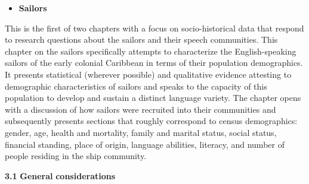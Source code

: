 \setcounter{itemize}{2}
\begin{itemize}
\item \begin{styleListParagraph}
\textbf{Sailors}
\end{styleListParagraph}
\end{itemize}

This is the first of two chapters with a focus on socio-historical data that respond to research questions about the sailors and their speech communities. This chapter on the sailors specifically attempts to characterize the English-speaking sailors of the early colonial Caribbean in terms of their population demographics. It presents statistical (wherever possible) and qualitative evidence attesting to demographic characteristics of sailors and speaks to the capacity of this population to develop and sustain a distinct language variety. The chapter opens with a discussion of how sailors were recruited into their communities and subsequently presents sections that roughly correspond to census demographics: gender, age, health and mortality, family and marital status, social status, financial standing, place of origin, language abilities, literacy, and number of people residing in the ship community. 

\textbf{3.1} \textbf{General} \textbf{considerations}

